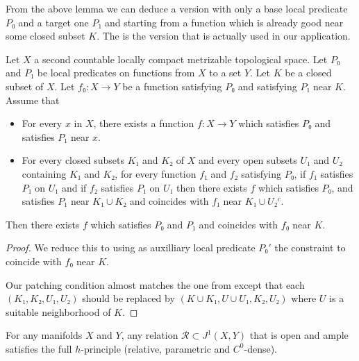 \documentclass[10pt,a4paper]{article}
\newcommand{\co}{\!:}
\newcommand{\Rel}{\mathcal{R}} %
\newcommand{\uses}[1]{}
\newcommand{\lean}[1]{}
\newcommand{\leanok}{}
\begin{document}
From the above lemma we can deduce a version with only a base local predicate $P₀$ and
a target one $P₁$ and starting from a function which is already good near some closed
subset $K$. The is the version that is actually used in our application.

\begin{lemma}
  \label{lem:relative_inductive_construction_of_loc}
  \lean{relative_inductive_construction_of_loc}\leanok
  Let $X$ a second countable locally compact metrizable topological space. Let $P₀$
  and $P₁$ be local predicates on functions from $X$ to a set $Y$.
  Let $K$ be a closed subset of $X$.
  Let $f₀ \co X → Y$ be a function satisfying $P₀$ and satisfying $P₁$ near $K$.
  Assume that
  \begin{itemize}
    \item
      For every $x$ in $X$, there exists a function $f \co X → Y$ which
      satisfies $P₀$ and satisfies $P₁$ near $x$.
    \item
      For every closed subsets $K₁$ and $K₂$ of $X$ and every open subsets $U₁$ and $U₂$
      containing $K₁$ and $K₂$, for every function $f₁$ and $f₂$ satisfying $P₀$,
      if $f₁$ satisfies $P₁$ on $U₁$ and if $f₂$ satisfies $P₁$ on $U₁$
      then there exists $f$ which satisfies $P₀$, and satisfies $P₁$ near
      $K₁ ∪ K₂$ and coincides with $f₁$ near $K₁ ∪ U₂^c$.
  \end{itemize}
  Then there exists $f$ which satisfies $P₀$ and $P₁$ and coincides with $f₀$ near $K$.
\end{lemma}

\begin{proof}\uses{lem:inductive_construction_of_loc}\leanok
  We reduce this to  using as auxilliary
  local predicate $P₀'$ the constraint to coincide with $f₀$ near $K$.

  Our patching condition almost matches the one from 
  except that each $(K₁, K₂, U₁, U₂)$ should be replaced by $(K ∪ K₁, U ∪ U₁, K₂, U₂)$
  where $U$ is a suitable neighborhood of $K$.
\end{proof}

\begin{theorem}[Gromov]
  \label{thm:open_ample}
  \leanok
  \lean{RelMfld.Ample.satisfiesHPrincipleWith}
  For any manifolds $X$ and $Y$, any relation $\Rel ⊂ J^1(X, Y)$ that is open
  and ample satisfies the full $h$-principle (relative, parametric and $C^0$-dense).
\end{theorem}
\end{document}
